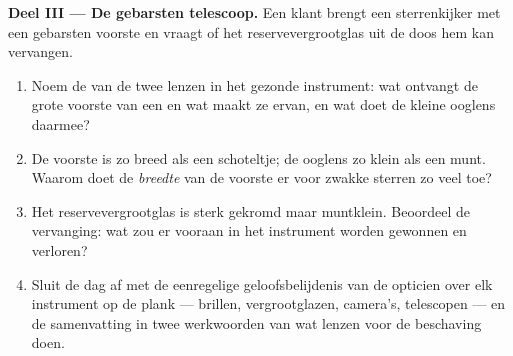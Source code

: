 \begin{problem}
\medskip\noindent\textbf{Deel III --- De gebarsten telescoop.}
Een klant brengt een sterrenkijker met een gebarsten voorste
 en vraagt of het reservevergrootglas uit de doos hem kan
vervangen.
\begin{enumerate}[resume]
  \item Noem de  van de twee lenzen in het gezonde instrument:
        wat ontvangt de grote voorste  van een
         en wat maakt ze ervan, en wat doet de kleine
        ooglens daarmee?
  \item De voorste  is zo breed als een schoteltje; de
        ooglens zo klein als een munt. Waarom doet de
        \emph{breedte} van de voorste  er voor zwakke
        sterren zo veel toe?
  \item Het reservevergrootglas is sterk gekromd maar muntklein.
        Beoordeel de vervanging: wat zou er vooraan in het instrument
        worden gewonnen en verloren?
  \item Sluit de dag af met de eenregelige geloofsbelijdenis van de
        opticien over elk instrument op de plank --- brillen,
        vergrootglazen, camera's, telescopen --- en de samenvatting in
        twee werkwoorden van wat lenzen voor de beschaving doen.
\end{enumerate}
\end{problem}
